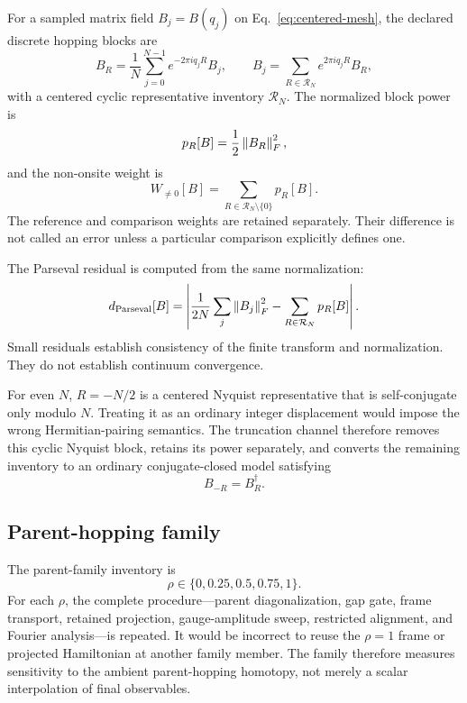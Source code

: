 For a sampled matrix field $B_j=B(q_j)$ on Eq.~\eqref{eq:centered-mesh}, the declared
discrete hopping blocks are
\begin{equation}
 B_R=\frac{1}{N}\sum_{j=0}^{N-1}e^{-2\pi iq_jR}B_j,
 \qquad
 B_j=\sum_{R\in\mathcal R_N}e^{2\pi iq_jR}B_R,
 \label{eq:discrete-fourier-pair}
\end{equation}
with a centered cyclic representative inventory $\mathcal R_N$.  The normalized block
power is
\begin{equation}
 p_R[B]=\frac{1}{2}\left\lVert B_R\right\rVert_F^2,
 \label{eq:block-power}
\end{equation}
and the non-onsite weight is
\begin{equation}
 W_{\ne0}[B]=\sum_{R\in\mathcal R_N\setminus\{0\}}p_R[B].
 \label{eq:nonzero-weight}
\end{equation}
The reference and comparison weights are retained separately.  Their difference is not
called an error unless a particular comparison explicitly defines one.

The Parseval residual is computed from the same normalization:
\begin{equation}
 d_{\mathrm{Parseval}}[B]
 =\left\lvert \frac{1}{2N}\sum_j\left\lVert B_j\right\rVert_F^2
       -\sum_{R\in\mathcal R_N}p_R[B]\right\rvert.
 \label{eq:parseval-defect}
\end{equation}
Small residuals establish consistency of the finite transform and normalization.  They
do not establish continuum convergence.

For even $N$, $R=-N/2$ is a centered Nyquist representative that is self-conjugate only
modulo $N$.  Treating it as an ordinary integer displacement would impose the wrong
Hermitian-pairing semantics.  The truncation channel therefore removes this cyclic
Nyquist block, retains its power separately, and converts the remaining inventory to an
ordinary conjugate-closed model satisfying
\begin{equation}
 B_{-R}=B_R^\dagger.
 \label{eq:ordinary-hermiticity}
\end{equation}

\subsection{Parent-hopping family}

The parent-family inventory is
\begin{equation}
 \rho\in\{0,0.25,0.5,0.75,1\}.
 \label{eq:rho-inventory}
\end{equation}
For each $\rho$, the complete procedure---parent diagonalization, gap gate, frame
transport, retained projection, gauge-amplitude sweep, restricted alignment, and Fourier
analysis---is repeated.  It would be incorrect to reuse the $\rho=1$ frame or projected
Hamiltonian at another family member.  The family therefore measures sensitivity to the
ambient parent-hopping homotopy, not merely a scalar interpolation of final observables.

